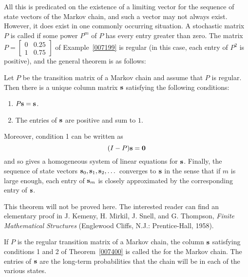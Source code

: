 \documentclass{ximera}
\begin{document}
All this is predicated on the existence of a limiting vector for the sequence of state vectors of the Markov chain, and such a vector may not always exist. However, it does exist in one commonly occurring situation. A stochastic matrix $P$ is called  if some power $P^{m}$ of $P$ has every entry greater than zero. The matrix $P = \begin{bmatrix}
 0 & 0.25 \\
 1 & 0.75
\end{bmatrix}$
 of Example~\ref{007199} is regular (in this case, each entry of $P^{2}$ is positive), and the general theorem is as follows:


\begin{theorem}\label{007400}
Let $P$ be the transition matrix of a Markov chain and assume that $P$ is regular. Then there is a unique column matrix ${\bf s}$ satisfying the following conditions:


\begin{enumerate}
\item $P{\bf s} = {\bf s}$.

\item The entries of ${\bf s}$ are positive and sum to $1$.

\end{enumerate}

Moreover, condition 1 can be written as
\begin{equation*}
(I - P){\bf s} = {\bf 0}
\end{equation*}
and so gives a homogeneous system of linear equations for ${\bf s}$. Finally, the sequence of state vectors ${\bf s}_{0}, {\bf s}_{1}, {\bf s}_{2}, \dots$ converges to ${\bf s}$ in the sense that if $m$ is large enough, each entry of ${\bf s}_{m}$ is closely approximated by the corresponding entry of ${\bf s}$.
\end{theorem}

\noindent This theorem will not be proved here.  The interested reader can find an elementary proof in J. Kemeny, H. Mirkil, J. Snell, and G. Thompson, \textit{Finite Mathematical Structures} (Englewood Cliffs, N.J.: Prentice-Hall, 1958).

If $P$ is the regular transition matrix of a Markov chain, the column ${\bf s}$ satisfying conditions 1 and 2 of Theorem~\ref{007400} is called the for the Markov chain. The entries of ${\bf s}$ are the long-term probabilities that the chain will be in each of the various states.
\end{document}
